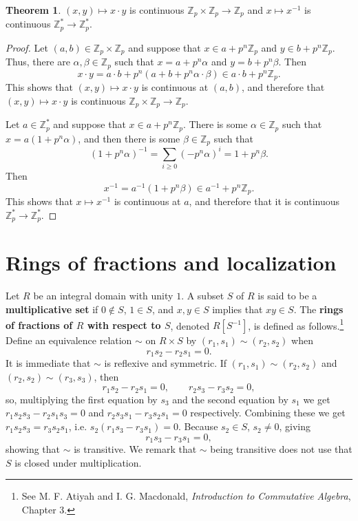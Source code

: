 \documentclass{article}
\theoremstyle{definition}
\newtheorem{theorem}{Theorem}
\theoremstyle{definition}
\begin{document}
\begin{theorem}
$(x,y) \mapsto x\cdot y$ is continuous $\mathbb{Z}_p \times \mathbb{Z}_p \to \mathbb{Z}_p$ and
$x \mapsto x^{-1}$ is continuous $\mathbb{Z}_p^* \to \mathbb{Z}_p^*$. 
\end{theorem}
\begin{proof}
Let $(a,b) \in \mathbb{Z}_p \times \mathbb{Z}_p$ and suppose that $x \in a+p^n \mathbb{Z}_p$ and $y \in b +p^n \mathbb{Z}_p$. 
Thus, there are $\alpha,\beta \in \mathbb{Z}_p$ such that $x=a+p^n\alpha$ and $y=b+p^n\beta$. Then
\[
x\cdot y = a\cdot b+p^n(a+b+p^n\alpha\cdot \beta) \in a\cdot b +p^n \mathbb{Z}_p.
\]
This shows that $(x,y) \mapsto x\cdot y$ is continuous at $(a,b)$, and therefore that $(x,y) \mapsto x\cdot y$ is continuous
$\mathbb{Z}_p \times \mathbb{Z}_p \to \mathbb{Z}_p$.

Let $a \in \mathbb{Z}_p^*$ and suppose that $x \in a+p^n \mathbb{Z}_p$. There is some $\alpha \in \mathbb{Z}_p$ such that
$x=a(1+p^n \alpha)$, and then there is some $\beta \in \mathbb{Z}_p$ such that
\[
(1+p^n \alpha)^{-1} = \sum_{i \geq 0} (-p^n \alpha)^i = 1+p^n \beta.
\]
Then
\[
x^{-1}=a^{-1}(1+p^n\beta) \in a^{-1} + p^n \mathbb{Z}_p.
\]
This shows that $x \mapsto x^{-1}$ is continuous at $a$, and therefore that it is continuous $\mathbb{Z}_p^* \to
\mathbb{Z}_p^*$.
\end{proof}


\section{Rings of fractions and localization}
Let $R$ be an integral domain with unity $1$. A subset $S$ of $R$ is said to be a 
\textbf{multiplicative set} if $0 \not \in S$, 
$1 \in S$, and 
$x,y \in S$ implies that $xy \in S$. The \textbf{rings of fractions of $R$ with respect to  $S$}, denoted $R[S^{-1}]$, is defined as follows.\footnote{See
M. F. Atiyah and I. G. Macdonald, {\em Introduction to Commutative Algebra}, Chapter 3.}
Define an equivalence relation $\sim$ on $R \times S$ by
$(r_1,s_1) \sim (r_2,s_2)$ when 
\[
r_1s_2-r_2 s_1=0.
\]
It is immediate that $\sim$ is reflexive and symmetric.
If $(r_1,s_1) \sim (r_2,s_2)$ and $(r_2,s_2) \sim (r_3,s_3)$, then
\[
r_1s_2-r_2 s_1=0, \qquad r_2s_3-r_3 s_2=0,
\]
so, multiplying the first equation by $s_3$ and the second equation by $s_1$ we get
$r_1s_2s_3-r_2s_1s_3 = 0$ and $r_2s_3s_1-r_3s_2s_1=0$ respectively. Combining these we get 
$r_1s_2s_3=r_3s_2s_1$, i.e. $s_2(r_1s_3-r_3s_1)=0$. Because $s_2 \in S$, $s_2 \neq 0$, giving 
\[
r_1s_3-r_3s_1=0,
\]
showing that $\sim$ is transitive. We remark that $\sim$ being transitive does not use that $S$ is closed under multiplication.
\end{document}
